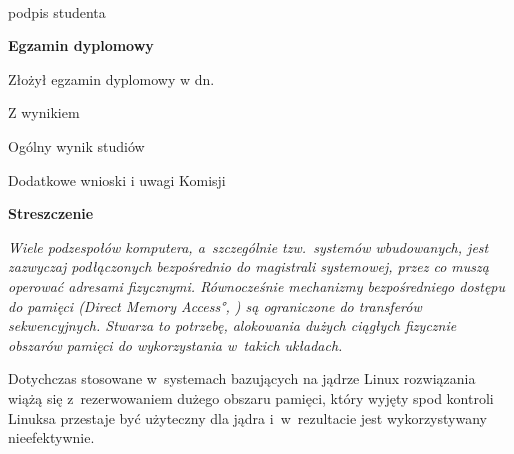 \begin{titlepage}
    \par
    \vspace{2\baselineskip}
    \hfill\parbox{15em}{{\small\dotfill}\\[-.3ex]
    \centerline{\footnotesize podpis studenta}}\par
    \vspace{3\baselineskip}
    \begin{center}
        {\large\bfseries Egzamin dyplomowy} \par\bigskip\bigskip
    \end{center}
    \par\noindent\vspace{\baselineskip}
    Złożył egzamin dyplomowy w dn. \dotfill
    \par\noindent\vspace{\baselineskip}
    Z wynikiem \dotfill
    \par\noindent\vspace{\baselineskip}
    Ogólny wynik studiów \dotfill
    \par\noindent\vspace{\baselineskip}
    Dodatkowe wnioski i uwagi Komisji \dotfill
    \par\noindent\vspace{\baselineskip}
    \dotfill

    \newpage\thispagestyle{empty}
    \vspace*{2\baselineskip}
    \begin{center}
        {\large\bfseries Streszczenie}\par\bigskip
    \end{center}

    {\itshape Wiele podzespołów komputera, a~szczególnie
      tzw.\ systemów wbudowanych, jest zazwyczaj podłączonych
      bezpośrednio do magistrali systemowej, przez co muszą operować
      adresami fizycznymi.  Równocześnie mechanizmy bezpośredniego
      dostępu do pamięci (\ang{Direct Memory Access}, ) są
      ograniczone do transferów sekwencyjnych.  Stwarza to potrzebę,
      alokowania dużych ciągłych fizycznie obszarów pamięci do
      wykorzystania w~takich układach.

      Dotychczas stosowane w~systemach bazujących na jądrze Linux
      rozwiązania wiążą się z~rezerwowaniem dużego obszaru pamięci,
      który wyjęty spod kontroli Linuksa przestaje być użyteczny dla
      jądra i~w~rezultacie jest wykorzystywany nieefektywnie.

}
\end{titlepage}
